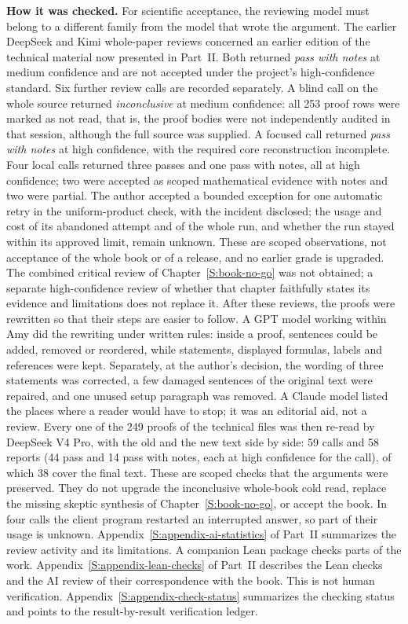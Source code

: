 \documentclass[12pt,oneside,openany]{book}
\numberwithin{equation}{section}
\theoremstyle{nogostyle}
\theoremstyle{definition}
\begin{document}
\medskip
\noindent\textbf{How it was checked.} For scientific acceptance, the reviewing
model must belong to a different family from the model that wrote the
argument. The earlier DeepSeek and Kimi whole-paper reviews concerned an
earlier edition of the technical material now presented in Part~II. Both
returned \emph{pass with notes} at medium confidence and are not accepted under
the project's high-confidence standard.
Six further review calls are recorded separately. A blind call on the whole
source returned \emph{inconclusive} at medium confidence: all 253 proof rows
were marked as not read, that is, the proof bodies were not independently
audited in that session, although the full source was supplied. A focused call
returned \emph{pass with notes} at high confidence, with the required core
reconstruction incomplete. Four local calls returned three passes and one pass
with notes, all at high confidence; two were accepted as scoped mathematical
evidence with notes and two were partial. The author accepted a bounded
exception for one automatic retry in the uniform-product check, with the
incident disclosed; the usage and cost of its abandoned attempt and of the
whole run, and whether the run stayed within its approved limit, remain
unknown. These are scoped observations, not acceptance of the whole book or of
a release, and no earlier grade is upgraded. The combined critical review of
Chapter~\ref{S:book-no-go} was not obtained; a separate high-confidence review
of whether that chapter faithfully states its evidence and limitations does
not replace it.
After these reviews, the proofs were rewritten so that their steps are easier
to follow. A GPT model working within Amy did the rewriting under written
rules: inside a proof, sentences could be added, removed or reordered, while
statements, displayed formulas, labels and references were kept. Separately,
at the author's decision, the wording of three statements was corrected, a few
damaged sentences of the original text were repaired, and one unused setup
paragraph was removed. A Claude model listed the places where a reader would
have to stop; it was an editorial aid, not a review. Every one of the 249
proofs of the technical files was then re-read by DeepSeek V4 Pro, with the old
and the new text side by side: 59 calls and 58 reports (44 pass and 14 pass
with notes, each at high confidence for the call), of which 38 cover the final
text. These are scoped checks that the arguments were preserved. They do not
upgrade the inconclusive whole-book cold read, replace the missing skeptic
synthesis of Chapter~\ref{S:book-no-go}, or accept the book. In four calls the
client program restarted an interrupted answer, so part of their usage is
unknown.
Appendix~\ref{S:appendix-ai-statistics} of Part~II summarizes the review
activity and its limitations. A companion Lean package checks parts of the
work.
Appendix~\ref{S:appendix-lean-checks} of Part~II describes the Lean checks and
the AI review of their correspondence with the book. This is not human
verification. Appendix~\ref{S:appendix-check-status} summarizes the checking
status and points to the result-by-result verification ledger.
\end{document}

